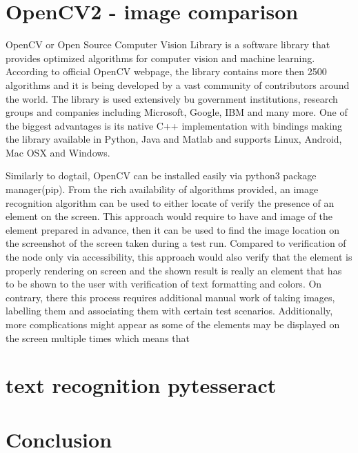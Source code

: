 \section{OpenCV2 - image comparison}
OpenCV or Open Source Computer Vision Library is a software library that provides optimized algorithms for computer vision and machine learning. According to official OpenCV webpage\cite{opencv}, the library contains more then 2500 algorithms and it is being developed 
by a vast community of contributors around the world. The library is used extensively bu government institutions, research groups and companies including Microsoft, Google, IBM and many more. One of the biggest advantages is its native C++ implementation with bindings making the library available in Python, Java and Matlab and supports Linux, Android, Mac OSX and Windows. 

Similarly to dogtail, OpenCV can be installed easily via python3 package manager(pip). From the rich availability of algorithms provided, an image recognition algorithm can be used to either locate of verify the presence of an element on the screen. This approach would require to have and image of the element prepared in advance, then it can be used to find the image location on the screenshot of the screen taken during a test run. Compared to verification of the node only via accessibility, this approach would also verify that the element is properly rendering on screen and the shown result is really an element that has to be shown to the user with verification of text formatting and colors. On contrary, there this process requires additional manual work of taking images, labelling them and associating them with certain test scenarios. Additionally, more complications might appear as some of the elements may be displayed on the screen multiple times which means that 
\section{text recognition pytesseract}

\section{Conclusion}